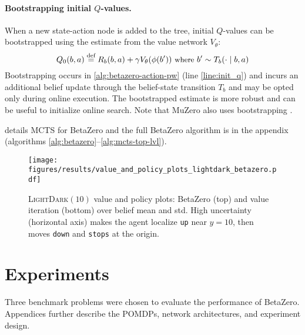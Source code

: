 \paragraph{Bootstrapping initial $Q$-values.} When a new state-action node is added to the tree, initial $Q$-values can be bootstrapped using the estimate from the value network $V_\theta$:
\begin{equation}
    \small
    Q_0(b, a) \stackrel{\text{def}}{=} R_b(b, a) + \gamma V_\theta(\phi(b')) \,\, \text{where} \,\, b' \sim T_b(\cdot \mid b, a)
\end{equation}
Bootstrapping occurs in \cref{alg:betazero-action-pw} (line \ref{line:init_q}) and incurs an additional belief update through the belief-state transition $T_b$ and may be opted only during online execution.
The bootstrapped estimate is more robust \cite{kumar2019stabilizing} and can be useful to initialize online search.
Note that MuZero also uses bootstrapping \cite{schrittwieser2020mastering}.

 details MCTS for BetaZero and the full BetaZero algorithm is in the appendix (algorithms \ref{alg:betazero}--\ref{alg:mcts-top-lvl}).

\begin{figure}[b!]
    
\end{figure}

\begin{figure*}[hb!]
    \centering
    \texttt{[image: figures/results/value\_and\_policy\_plots\_lightdark\_betazero.pdf]}
    \caption{\textsc{LightDark}$(10)$ value and policy plots: BetaZero (top) and value iteration (bottom) over belief mean and std. High uncertainty (horizontal axis) makes the agent localize \texttt{up} near $y=10$, then moves \texttt{down} and \texttt{stops} at the origin.}
    \label{fig:lightdark_value_policy}
\end{figure*}

\section{Experiments}\label{sec:experiments}

Three benchmark problems were chosen to evaluate the performance of BetaZero.
Appendices further describe the POMDPs, network architectures, and experiment design.


